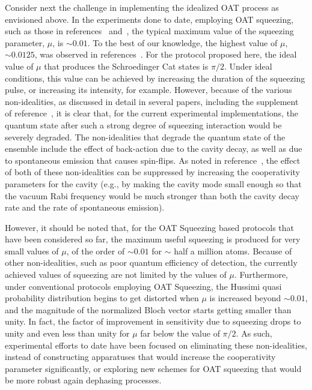 \documentclass[aps,pra,letterpaper,superscriptaddress,showpacs,amsmath,floats,twocolumn]{revtex4-1}
\begin{document}
Consider next the challenge in implementing the idealized OAT process as envisioned above. In the experiments done to date, employing OAT squeezing, such as those in references~\cite{Leroux1} and~\cite{Antisqzexpt}, the typical maximum value of the squeezing parameter, $\mu$, is $\sim 0.01$. To the best of our knowledge, the highest value of $\mu$, $\sim 0.0125$, was observed in references~\cite{Leroux1}. For the protocol proposed here, the ideal value of $\mu$ that produces the Schroedinger Cat states is $\pi /2$. Under ideal conditions, this value can be achieved by increasing the duration of the squeezing pulse, or increasing its intensity, for example. However, because of the various non-idealities, as discussed in detail in several papers, including the supplement of reference~\cite{Antisqz}, it is clear that, for the current experimental implementations, the quantum state after such a strong degree of squeezing interaction would be severely degraded. The non-idealities that degrade the quantum state of the ensemble include the effect of back-action due to the cavity decay, as well as due to spontaneous emission that causes spin-flips. As noted in reference~\cite{Antisqz}, the effect of both of these non-idealities can be suppressed by increasing the cooperativity parameters for the cavity (e.g., by making the cavity mode small enough so that the vacuum Rabi frequency would be much stronger than both the cavity decay rate and the rate of spontaneous emission).

However, it should be noted that, for the OAT Squeezing based protocols that have been considered so far, the maximum useful squeezing is produced for very small values of $\mu$, of the order of $\sim 0.01$ for $\sim$ half a million atoms. Because of other non-idealities, such as poor quantum efficiency of detection, the currently achieved values of squeezing are not limited by the values of $\mu$. Furthermore, under conventional protocols employing OAT Squeezing, the Hussimi quasi probability distribution begins to get distorted when $\mu$ is increased beyond $\sim 0.01$, and the magnitude of the normalized Bloch vector starts getting smaller than unity. In fact, the factor of improvement in sensitivity due to squeezing drops to unity and even less than unity for $\mu$ far below the value of $\pi/2$. As such, experimental efforts to date have been focused on eliminating these non-idealities, instead of constructing apparatuses that would increase the cooperativity parameter significantly, or exploring new schemes for OAT squeezing that would be more robust again dephasing processes. 
\end{document}
